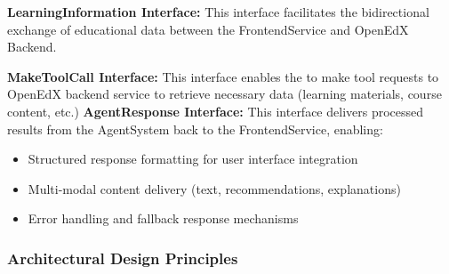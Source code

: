 \documentclass[../Main.tex]{subfiles}
\begin{document}
	\textbf{LearningInformation Interface:} This interface facilitates the
	bidirectional exchange of educational data between the FrontendService and
	OpenEdX Backend.

	\textbf{MakeToolCall Interface:} This interface enables the  to make
	tool requests to OpenEdX backend service to retrieve necessary data (learning
	materials, course content, etc.) \textbf{AgentResponse Interface:} This interface
	delivers processed results from the AgentSystem back to the FrontendService,
	enabling:
	\begin{itemize}
		\item Structured response formatting for user interface integration

		\item Multi-modal content delivery (text, recommendations, explanations)

		\item Error handling and fallback response mechanisms
	\end{itemize}

	\subsubsection{Architectural Design Principles}
	\label{section:4.2.1.3_architectural_design_principles}
\end{document}
